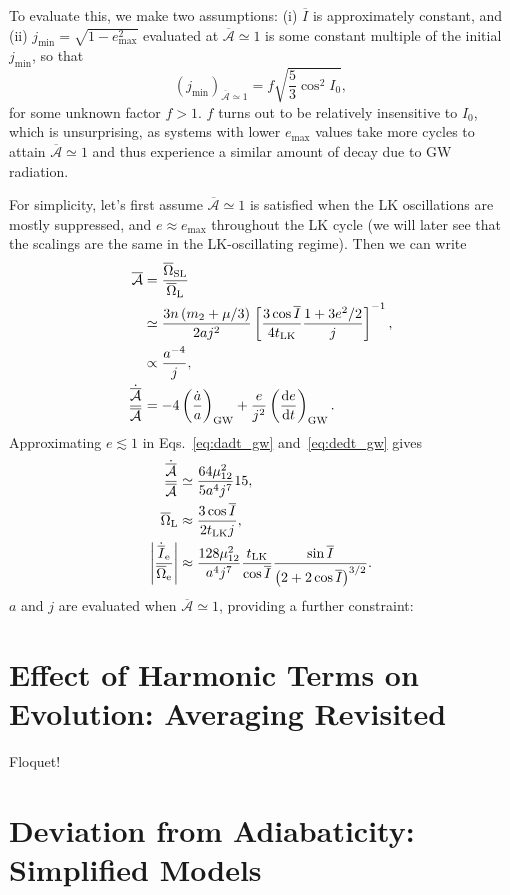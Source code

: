 \documentclass[
        fleqn,
        usenatbib,
    ]{mnras}
\newcommand*{\rd}[2]{\frac{\mathrm{d}#1}{\mathrm{d}#2}}
\newcommand*{\abs}[1]{\left|#1\right|}
\newcommand*{\p}[1]{\left(#1\right)}
\newcommand*{\s}[1]{\left[#1\right]}
\begin{document}
To evaluate this, we make two assumptions: (i) $\overline{I}$ is approximately
constant, and (ii) $j_{\min} = \sqrt{1 - e_{\max}^2}$ evaluated at
$\overline{\mathcal{A}} \simeq 1$ is some constant multiple of the initial
$j_{\min}$, so that
\begin{equation}
    \p{j_{\min}}_{\overline{\mathcal{A}} \simeq 1} = f \sqrt{\frac{5}{3}\cos^2
        I_0},
\end{equation}
for some unknown factor $f > 1$. $f$ turns out to be relatively insensitive to
$I_0$, which is unsurprising, as systems with lower $e_{\max}$ values take more
cycles to attain $\overline{\mathcal{A}} \simeq 1$ and thus experience a similar
amount of decay due to GW radiation.

For simplicity, let's first assume $\overline{\mathcal{A}} \simeq 1$ is
satisfied when the LK oscillations are mostly suppressed, and $e \approx
e_{\max}$ throughout the LK cycle (we will later see that the scalings are the
same in the LK-oscillating regime). Then we can write
\begin{align}
    \overline{\mathcal{A}} &= \frac{\overline{\Omega}_{\rm SL}}{
        \overline{\Omega}_{\rm L}}\\
        &\simeq \frac{3n\p{m_2 + \mu/3}}{2aj^2}\s{\frac{3\cos \overline{I}}{
            4t_{\rm LK}} \frac{1 + 3e^2/2}{j}}^{-1},\\
        &\propto \frac{a^{-4}}{j},\\
    \frac{\dot{\overline{\mathcal{A}}}}{\overline{\mathcal{A}}}
        &= -4\p{\frac{\dot{a}}{a}}_{\rm GW}
            + \frac{e}{j^2}\p{\rd{e}{t}}_{\rm GW}.
\end{align}
Approximating $e \lesssim 1$ in Eqs.~\eqref{eq:dadt_gw} and~\eqref{eq:dedt_gw}
gives
\begin{align}
    \frac{\dot{\overline{\mathcal{A}}}}{\overline{\mathcal{A}}}
        &\simeq \frac{64\mu_{12}^2}{5a^4j^7}15,\\
    \overline{\Omega}_{\rm L}
        &\approx \frac{3\cos \overline{I}}{2t_{\rm LK}j},\\
    \abs{\frac{\dot{\overline{I}}_{\rm e}}{\overline{\Omega}_{\rm e}}}
        &\approx \frac{128\mu_{12}^2}{a^4j^7}
            \frac{t_{\rm LK}}{\cos \overline{I}}
            \frac{\sin \overline{I}}{\p{2 + 2\cos \overline{I}}^{3/2}}.
\end{align}
$a$ and $j$ are evaluated when $\overline{\mathcal{A}} \simeq 1$, providing a
further constraint:




\clearpage
\onecolumn
\appendix

\section{Effect of Harmonic Terms on Evolution: Averaging Revisited
}\label{s:harmonic}

Floquet!

\section{Deviation from Adiabaticity: Simplified Models}\label{s:ad_dev_toy}

\bsp
\label{lastpage} %
\end{document}
